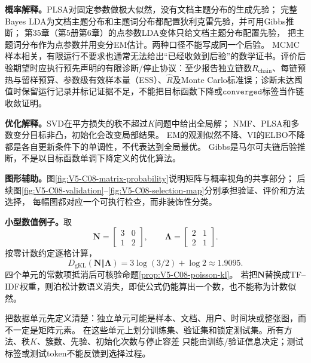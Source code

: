 \label{struct:V5-C08-CH15}
\textbf{概率解释。}PLSA对固定参数做极大似然，没有文档主题分布的生成先验；
完整Bayes LDA为文档主题分布和主题词分布都配置狄利克雷先验，并可用Gibbs推断；
第35章（第5册第6章）的点参数LDA变体只给文档主题分布配置先验，
把主题词分布作为点参数并用变分EM估计。两种口径不能写成同一个后验。
MCMC样本相关，有限运行不要求也通常无法给出“已经收敛到后验”的数学证书。评价后验期望时应执行预先声明的有限诊断/停止协议：至少报告独立链数$R_{\mathrm{chain}}$、每链预热与留样预算、参数级有效样本量（ESS）、$\widehat R$及Monte Carlo标准误；诊断未达阈值时保留运行记录并标记证据不足，不能把目标函数下降或$\mathtt{converged}$标签当作链收敛证明。

\label{struct:V5-C08-CH16}
\textbf{优化解释。}SVD在平方损失的秩不超过$K$问题中给出全局解；
NMF、PLSA和多数变分目标非凸，初始化会改变局部结果。
EM的观测似然不降、VI的ELBO不降都是各自更新条件下的单调性，不代表达到全局最优。
Gibbs是马尔可夫链后验推断，不是以目标函数单调下降定义的优化算法。

\label{struct:V5-C08-CH17}
\textbf{图形辅助。}图\ref{fig:V5-C08-matrix-probability}说明矩阵与概率视角的共享部分；
后续图\ref{fig:V5-C08-validation}--\ref{fig:V5-C08-selection-map}分别承担验证、评价和方法选择，
每幅图都对应一个可执行检查，而非装饰性分类。

\label{struct:V5-C08-CH18}
\textbf{小型数值例子。}取
\[
\boldsymbol N=\begin{bmatrix}3&0\\1&2\end{bmatrix},\qquad
\boldsymbol\Lambda=\begin{bmatrix}2&1\\2&1\end{bmatrix}.
\]
按零计数约定逐格计算，
\[
D_{\mathrm{gKL}}(\boldsymbol N\Vert\boldsymbol\Lambda)
=3\log(3/2)+\log2\approx1.9095.
\]
四个单元的常数项抵消后可核验命题\ref{prop:V5-C08-poisson-kl}。
若把$\boldsymbol N$替换成TF--IDF权重，则泊松计数语义消失，即使公式仍能算出一个数，也不能称为计数似然。


把数据单元先定义清楚：独立单元可能是样本、文档、用户、时间块或整张图，而不一定是矩阵元素。
在这些单元上划分训练集、验证集和锁定测试集。所有方法、秩$K$、簇数、先验、初始化次数与停止容差
只能由训练/验证信息决定；测试标签或测试token不能反馈到选择过程。

